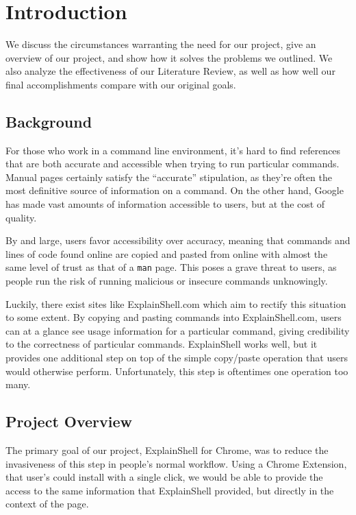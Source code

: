 \documentclass[11pt]{article}
\begin{document}
\section{Introduction}

We discuss the circumstances warranting the need for our project, give an
overview of our project, and show how it solves the problems we outlined. We
also analyze the effectiveness of our Literature Review, as well as how well our
final accomplishments compare with our original goals.

\subsection{Background}

For those who work in a command line environment, it's hard to find references
that are both accurate and accessible when trying to run particular commands.
Manual pages certainly satisfy the ``accurate'' stipulation, as they're often
the most definitive source of information on a command. On the other hand,
Google has made vast amounts of information accessible to users, but at the cost
of quality.

By and large, users favor accessibility over accuracy, meaning that commands and
lines of code found online are copied and pasted from online with almost the
same level of trust as that of a \texttt{man} page. This poses a grave threat to
users, as people run the risk of running malicious or insecure commands
unknowingly.

Luckily, there exist sites like ExplainShell.com which aim to rectify this
situation to some extent. By copying and pasting commands into ExplainShell.com,
users can at a glance see usage information for a particular command, giving
credibility to the correctness of particular commands. ExplainShell works well,
but it provides one additional step on top of the simple copy/paste operation
that users would otherwise perform. Unfortunately, this step is oftentimes one
operation too many.

\subsection{Project Overview}

The primary goal of our project, ExplainShell for Chrome, was to reduce the
invasiveness of this step in people's normal workflow. Using a Chrome Extension,
that user's could install with a single click, we would be able to provide the
access to the same information that ExplainShell provided, but directly in the
context of the page.
\end{document}

